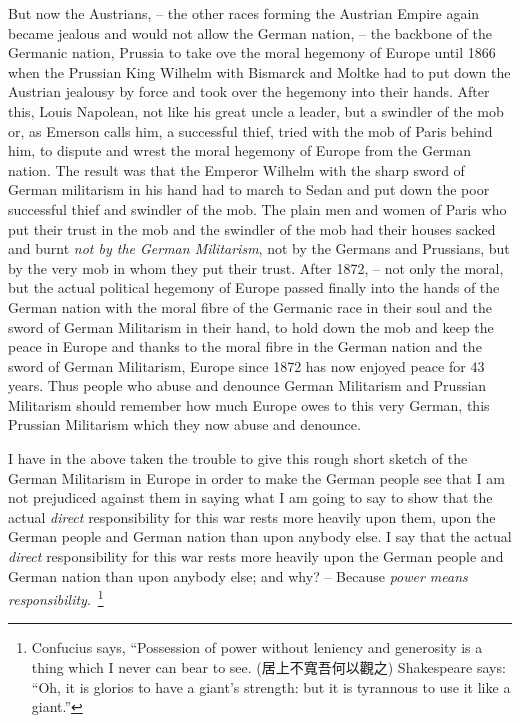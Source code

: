 But now the Austrians, -- the other races forming the Austrian Empire again became jealous and would not allow the German nation, -- the backbone of the Germanic nation, Prussia to take ove the moral hegemony of Europe until 1866 when the Prussian King Wilhelm with Bismarck and Moltke had to put down the Austrian jealousy by force and took over the hegemony into their hands.
After this, Louis Napolean, not like his great uncle a leader, but a swindler of the mob or, as Emerson calls him, a successful thief, tried with the mob of Paris behind him, to dispute and wrest the moral hegemony of Europe from the German nation.
The result was that the Emperor Wilhelm with the sharp sword of German militarism in his hand had to march to Sedan and put down the poor successful thief and swindler of the mob.
The plain men and women of Paris who put their trust in the mob and the swindler of the mob had their houses sacked and burnt \emph{not by the German Militarism}, not by the Germans and Prussians, but by the very mob in whom they put their trust.
After 1872, -- not only the moral, but the actual political hegemony of Europe passed finally into the hands of the German nation with the moral fibre of the Germanic race in their soul and the sword of German Militarism in their hand,
to hold down the mob and keep the peace in Europe and thanks to the moral fibre in the German nation and the sword of German Militarism, Europe since 1872 has now enjoyed peace for 43 years.
Thus people who abuse and denounce German Militarism and Prussian Militarism should remember how much Europe owes to this very German, this Prussian Militarism which they now abuse and denounce.

I have in the above taken the trouble to give this rough short sketch of the German Militarism in Europe in order to make the German people see that I am not prejudiced against them in saying what I am going to say to show that the actual \emph{direct} responsibility for this war rests more heavily upon them,
upon the German people and German nation than upon anybody else.
I say that the actual \emph{direct} responsibility for this war rests more heavily upon the German people and German nation than upon anybody else;
and why? -- Because \emph{power means responsibility}.\
\footnote{Confucius says, ``Possession of power without leniency and generosity is a thing which I never can bear to see. (居上不寬吾何以觀之) Shakespeare says: ``Oh, it is glorios to have a giant's strength: but it is tyrannous to use it like a giant.''}

